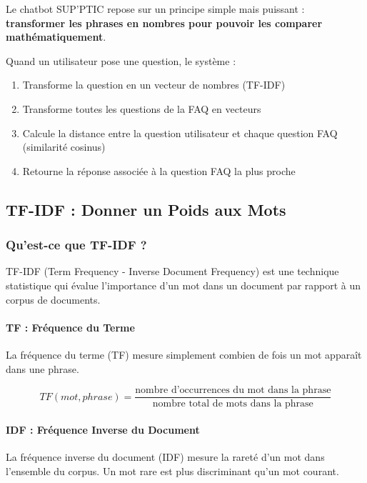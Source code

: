 \documentclass[11pt,a4paper]{article}
\begin{document}
Le chatbot SUP'PTIC repose sur un principe simple mais puissant : \textbf{transformer les phrases en nombres pour pouvoir les comparer mathématiquement}.

\begin{info}
Quand un utilisateur pose une question, le système :
\begin{enumerate}
    \item Transforme la question en un vecteur de nombres (TF-IDF)
    \item Transforme toutes les questions de la FAQ en vecteurs
    \item Calcule la distance entre la question utilisateur et chaque question FAQ (similarité cosinus)
    \item Retourne la réponse associée à la question FAQ la plus proche
\end{enumerate}
\end{info}

\subsection{TF-IDF : Donner un Poids aux Mots}

\subsubsection{Qu'est-ce que TF-IDF ?}

TF-IDF (Term Frequency - Inverse Document Frequency) est une technique statistique qui évalue l'importance d'un mot dans un document par rapport à un corpus de documents.

\paragraph{TF : Fréquence du Terme}

La fréquence du terme (TF) mesure simplement combien de fois un mot apparaît dans une phrase.

\[
TF(mot, phrase) = \frac{\text{nombre d'occurrences du mot dans la phrase}}{\text{nombre total de mots dans la phrase}}
\]

\paragraph{IDF : Fréquence Inverse du Document}

La fréquence inverse du document (IDF) mesure la rareté d'un mot dans l'ensemble du corpus. Un mot rare est plus discriminant qu'un mot courant.
\end{document}
